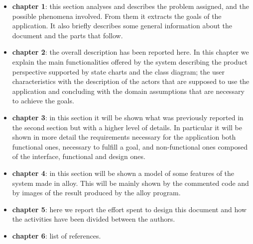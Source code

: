 \begin{itemize}
	\item \textbf{chapter 1}: this section analyses and describes the problem assigned, and the possible phenomena involved. From them it extracts the goals of the application. It also briefly describes some general information about the document and the parts that follow.
	\item \textbf{chapter 2}: the overall description has been reported here. In this chapter we explain the main functionalities offered by the system describing the product perspective supported by state charts and the class diagram; the user characteristics with the description of the actors that are supposed to use the application and concluding with the domain assumptions that are necessary to achieve the goals.
	\item \textbf{chapter 3}: in this section it will be shown what was previously reported in the second section but with a higher level of details. In particular it will be shown in more detail the requirements necessary for the application both functional ones, necessary to fulfill a goal, and non-functional ones composed of the interface, functional and design ones.
	\item \textbf{chapter 4}: in this section will be shown a model of some features of the system made in alloy. This will be mainly shown by the commented code and by images of the result produced by the alloy program.
	\item \textbf{chapter 5}: here we report the effort spent to design this document and how the activities have been divided between the authors.
	\item \textbf{chapter 6}: list of references.
\end{itemize}